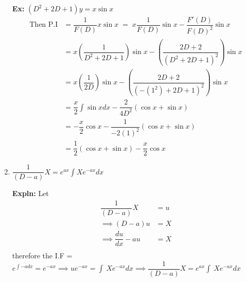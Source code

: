 \documentclass[a4paper, titlepage]{article}
\begin{document}
\begin{enumerate}[label=\textbf{\Roman*}]
            \textbf{Ex: } $(D^2 + 2D + 1)y = x\sin x$
            \begin{align*}
                \text{Then P.I} &= \dfrac{1}{F(D)}x\sin x \;
                                 = \; x\dfrac{1}{F(D)}\sin x - \dfrac{F'(D)}{F(D)^2}\sin x \\
                                &= x\left( \dfrac{1}{D^2 + 2D + 1} \right)\sin x - \left(\dfrac{2D + 2}{(D^2 + 2D + 1)^2} \right) \sin x \\
                                &= x\left( \dfrac{1}{2D} \right)\sin x - \left(\dfrac{2D + 2}{(-(1^2) + 2D + 1)^2} \right) \sin x \\
                                &= \dfrac{x}{2}\displaystyle\int \sin x dx - \dfrac{2}{4D^2}(\cos x + \sin x) \\
                                &= -\dfrac{x}{2}\cos x - \dfrac{1}{-2(1)^2}(\cos x + \sin x) \\
                                &= \dfrac{1}{2}(\cos x + \sin x) - \dfrac{x}{2}\cos x
            \end{align*}
            \item $\dfrac{1}{(D-a)}X = e^{ax}\displaystyle\int Xe^{-ax}dx$
            \item[\textbf{Expln: }] Let
            \begin{align*}
                \dfrac{1}{(D-a)}X & = u \\
                \implies (D-a)u & = X \\
                \implies \dfrac{du}{dx} - au & = X \\
            \end{align*}
            therefore the I.F = $e^{\int -adx} = e^{-ax} \implies
            ue^{-ax} = \displaystyle\int\ Xe^{-ax} dx \implies
            \boxed{\dfrac{1}{(D-a)}X = e^{ax} \displaystyle\int\ Xe^{-ax} dx} $
        \end{enumerate}
    
\end{document}

